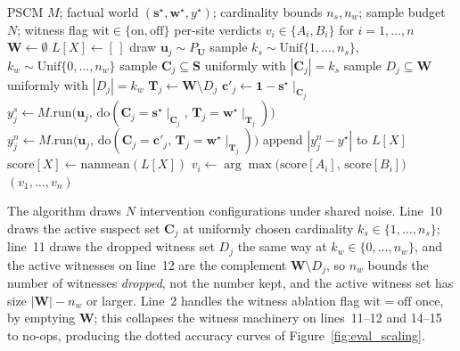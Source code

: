 \begin{algorithm}[ht]
\caption{Approximate PCI estimator on the scaled throwing problem.}
\label{alg:pci_thin_search}
\begin{algorithmic}[1]
\Require PSCM $M$; factual world
$(\mathbf{s}^\star,\mathbf{w}^\star,y^\star)$; cardinality bounds
$n_s, n_w$; sample budget $N$; witness flag
$\mathrm{wit}\in\{\text{on},\text{off}\}$
\Ensure per-site verdicts $v_i\in\{A_i,B_i\}$ for $i=1,\dots,n$
  \State $\mathbf{W} \gets \emptyset$ 
\EndIf
{}
  \State $L[X] \gets [\,]$ 
\EndFor
{}
  \State draw $\mathbf{u}_j \sim P_{\mathbf{U}}$
  \State sample $k_s \sim \mathrm{Unif}\{1,\dots,n_s\}$,\quad
         $k_w \sim \mathrm{Unif}\{0,\dots,n_w\}$
  \State sample $\mathbf{C}_j \subseteq \mathbf{S}$ uniformly with
         $|\mathbf{C}_j| = k_s$
  \State sample $D_j \subseteq \mathbf{W}$ uniformly with $|D_j| = k_w$
  \State $\mathbf{T}_j \gets \mathbf{W} \setminus D_j$
  \State $\mathbf{c}'_j \gets \mathbf{1} - \mathbf{s}^\star\!\mid_{\mathbf{C}_j}$
  \State $y^s_j \gets M.\mathrm{run}\bigl(\mathbf{u}_j,\,
         \mathrm{do}(\mathbf{C}_j = \mathbf{s}^\star\!\mid_{\mathbf{C}_j},\,
         \mathbf{T}_j = \mathbf{w}^\star\!\mid_{\mathbf{T}_j})\bigr)$
  \State $y^n_j \gets M.\mathrm{run}\bigl(\mathbf{u}_j,\,
         \mathrm{do}(\mathbf{C}_j = \mathbf{c}'_j,\,
         \mathbf{T}_j = \mathbf{w}^\star\!\mid_{\mathbf{T}_j})\bigr)$
    \State append $|y^n_j - y^\star|$ to $L[X]$
  \EndFor
\EndFor
{}
  \State $\mathrm{score}[X] \gets \mathrm{nanmean}(L[X])$
\EndFor
{}
  \State $v_i \gets \arg\max\bigl(\mathrm{score}[A_i],\,\mathrm{score}[B_i]\bigr)$
\EndFor
\State \Return $(v_1, \dots, v_n)$
\end{algorithmic}
\end{algorithm}

The algorithm draws $N$ intervention configurations under shared noise.
Line~10 draws the active suspect set $\mathbf{C}_j$ at uniformly chosen
cardinality $k_s \in \{1,\dots,n_s\}$; line~11 draws the dropped witness set $D_j$
the same way at $k_w \in \{0,\dots,n_w\}$, and the active
witnesses on line~12 are the complement $\mathbf{W}\setminus D_j$, so
$n_w$ bounds the number of witnesses \emph{dropped}, not the number kept,
and the active witness set has size $|\mathbf{W}|-n_w$ or larger. Line~2
handles the witness ablation flag $\mathrm{wit}=\text{off}$ once,
by emptying $\mathbf{W}$; this collapses the witness machinery on
lines~11--12 and 14--15 to no-ops, producing the dotted accuracy curves of
Figure~\ref{fig:eval_scaling}.

